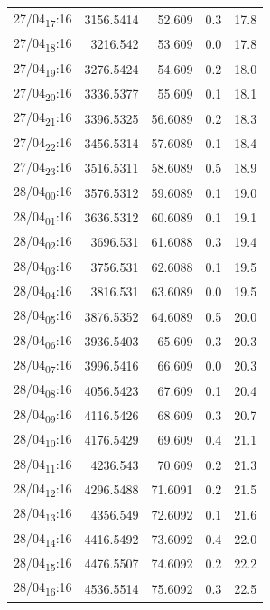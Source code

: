 \documentclass[11pt]{article}
\begin{document}
\begin{table}[htbp]
\begin{tabular}{lrrrr}
27/04\textsubscript{17}:16 & 3156.5414 & 52.609 & 0.3 & 17.8\\[0pt]
27/04\textsubscript{18}:16 & 3216.542 & 53.609 & 0.0 & 17.8\\[0pt]
27/04\textsubscript{19}:16 & 3276.5424 & 54.609 & 0.2 & 18.0\\[0pt]
27/04\textsubscript{20}:16 & 3336.5377 & 55.609 & 0.1 & 18.1\\[0pt]
27/04\textsubscript{21}:16 & 3396.5325 & 56.6089 & 0.2 & 18.3\\[0pt]
27/04\textsubscript{22}:16 & 3456.5314 & 57.6089 & 0.1 & 18.4\\[0pt]
27/04\textsubscript{23}:16 & 3516.5311 & 58.6089 & 0.5 & 18.9\\[0pt]
28/04\textsubscript{00}:16 & 3576.5312 & 59.6089 & 0.1 & 19.0\\[0pt]
28/04\textsubscript{01}:16 & 3636.5312 & 60.6089 & 0.1 & 19.1\\[0pt]
28/04\textsubscript{02}:16 & 3696.531 & 61.6088 & 0.3 & 19.4\\[0pt]
28/04\textsubscript{03}:16 & 3756.531 & 62.6088 & 0.1 & 19.5\\[0pt]
28/04\textsubscript{04}:16 & 3816.531 & 63.6089 & 0.0 & 19.5\\[0pt]
28/04\textsubscript{05}:16 & 3876.5352 & 64.6089 & 0.5 & 20.0\\[0pt]
28/04\textsubscript{06}:16 & 3936.5403 & 65.609 & 0.3 & 20.3\\[0pt]
28/04\textsubscript{07}:16 & 3996.5416 & 66.609 & 0.0 & 20.3\\[0pt]
28/04\textsubscript{08}:16 & 4056.5423 & 67.609 & 0.1 & 20.4\\[0pt]
28/04\textsubscript{09}:16 & 4116.5426 & 68.609 & 0.3 & 20.7\\[0pt]
28/04\textsubscript{10}:16 & 4176.5429 & 69.609 & 0.4 & 21.1\\[0pt]
28/04\textsubscript{11}:16 & 4236.543 & 70.609 & 0.2 & 21.3\\[0pt]
28/04\textsubscript{12}:16 & 4296.5488 & 71.6091 & 0.2 & 21.5\\[0pt]
28/04\textsubscript{13}:16 & 4356.549 & 72.6092 & 0.1 & 21.6\\[0pt]
28/04\textsubscript{14}:16 & 4416.5492 & 73.6092 & 0.4 & 22.0\\[0pt]
28/04\textsubscript{15}:16 & 4476.5507 & 74.6092 & 0.2 & 22.2\\[0pt]
28/04\textsubscript{16}:16 & 4536.5514 & 75.6092 & 0.3 & 22.5\\[0pt]

\end{tabular}
\end{table}
\end{document}
